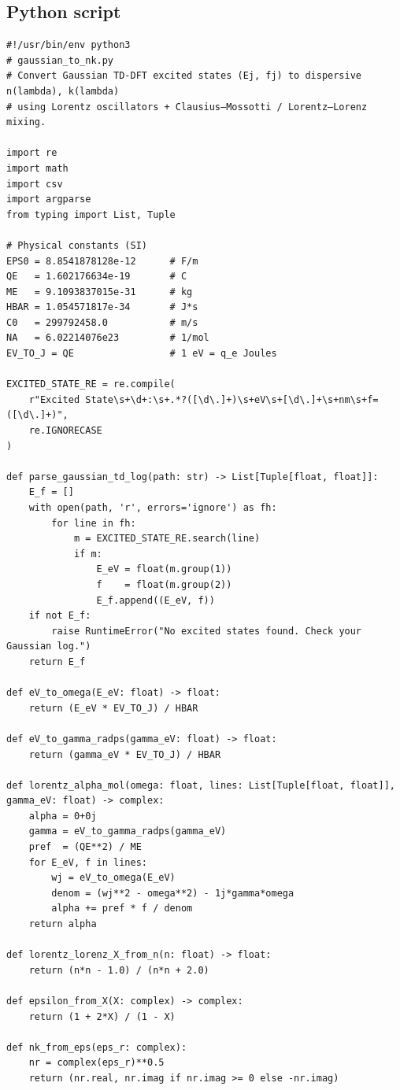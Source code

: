 \documentclass[11pt,a4paper]{article}
\begin{document}
\subsection*{Python script}
\begin{verbatim}
#!/usr/bin/env python3
# gaussian_to_nk.py
# Convert Gaussian TD-DFT excited states (Ej, fj) to dispersive n(lambda), k(lambda)
# using Lorentz oscillators + Clausius–Mossotti / Lorentz–Lorenz mixing.

import re
import math
import csv
import argparse
from typing import List, Tuple

# Physical constants (SI)
EPS0 = 8.8541878128e-12      # F/m
QE   = 1.602176634e-19       # C
ME   = 9.1093837015e-31      # kg
HBAR = 1.054571817e-34       # J*s
C0   = 299792458.0           # m/s
NA   = 6.02214076e23         # 1/mol
EV_TO_J = QE                 # 1 eV = q_e Joules

EXCITED_STATE_RE = re.compile(
    r"Excited State\s+\d+:\s+.*?([\d\.]+)\s+eV\s+[\d\.]+\s+nm\s+f=([\d\.]+)",
    re.IGNORECASE
)

def parse_gaussian_td_log(path: str) -> List[Tuple[float, float]]:
    E_f = []
    with open(path, 'r', errors='ignore') as fh:
        for line in fh:
            m = EXCITED_STATE_RE.search(line)
            if m:
                E_eV = float(m.group(1))
                f    = float(m.group(2))
                E_f.append((E_eV, f))
    if not E_f:
        raise RuntimeError("No excited states found. Check your Gaussian log.")
    return E_f

def eV_to_omega(E_eV: float) -> float:
    return (E_eV * EV_TO_J) / HBAR

def eV_to_gamma_radps(gamma_eV: float) -> float:
    return (gamma_eV * EV_TO_J) / HBAR

def lorentz_alpha_mol(omega: float, lines: List[Tuple[float, float]], gamma_eV: float) -> complex:
    alpha = 0+0j
    gamma = eV_to_gamma_radps(gamma_eV)
    pref  = (QE**2) / ME
    for E_eV, f in lines:
        wj = eV_to_omega(E_eV)
        denom = (wj**2 - omega**2) - 1j*gamma*omega
        alpha += pref * f / denom
    return alpha

def lorentz_lorenz_X_from_n(n: float) -> float:
    return (n*n - 1.0) / (n*n + 2.0)

def epsilon_from_X(X: complex) -> complex:
    return (1 + 2*X) / (1 - X)

def nk_from_eps(eps_r: complex):
    nr = complex(eps_r)**0.5
    return (nr.real, nr.imag if nr.imag >= 0 else -nr.imag)


\end{verbatim}
\end{document}
